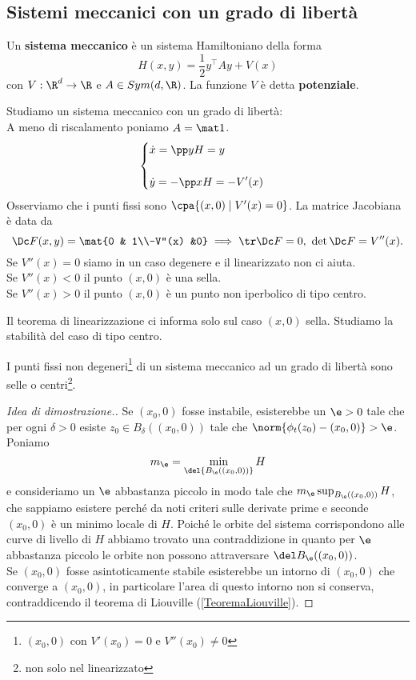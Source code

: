\subsection{Sistemi meccanici con un grado di libert\`a}
\begin{definition}
Un \textbf{sistema meccanico} \`e un sistema Hamiltoniano della forma
\[H(x,y)=\frac12y^\top A y+V(x)\]
con $V:\R^d\to\R$ e $A\in Sym(d,\R)$. La funzione $V$ \`e detta \textbf{potenziale}.
\end{definition}

\noindent Studiamo un sistema meccanico con un grado di libert\`a:\\
A meno di riscalamento poniamo $A=\mat1$.
\[\begin{cases}
\displaystyle\dot x=\pp yH=y\\\\
\displaystyle\dot y=-\pp xH=-V'(x)
\end{cases}\]
Osserviamo che i punti fissi sono $\cpa{(x,0)\mid V'(x)=0}$. La matrice Jacobiana \`e data da
\[\Dc F(x,y)=\mat{0 & 1\\-V''(x) &0}\implies \tr \Dc F=0,\ \det \Dc F=V''(x).\]
Se $V''(x)=0$ siamo in un caso degenere e il linearizzato non ci aiuta.\\
Se $V''(x)<0$ il punto $(x,0)$ \`e una sella.\\
Se $V''(x)>0$ il punto $(x,0)$ \`e un punto non iperbolico di tipo centro.
\vspace*{0.5cm}

\noindent Il teorema di linearizzazione ci informa solo sul caso $(x,0)$ sella. Studiamo la stabilit\`a del caso di tipo centro.



\begin{proposition}\label{CaratterizzazionePuntiFissiSistemaMeccanico1GradoLiberta}
I punti fissi non degeneri\footnote{$(x_0,0)$ con $V'(x_0)=0$ e $V''(x_0)\neq 0$} di un sistema meccanico ad un grado di libert\`a sono selle o centri\footnote{non solo nel linearizzato}.
\end{proposition}
\begin{proof}[Idea di dimostrazione.]
Se $(x_0,0)$ fosse instabile, esisterebbe un $\e>0$ tale che per ogni $\delta>0$ esiste $z_0\in B_\delta((x_0,0))$ tale che $\norm{\phi_t(z_0)-(x_0,0)}>\e$. Poniamo
\[m_\e=\min_{\del{B_\e((x_0,0))}} H\]
e consideriamo un $\e$ abbastanza piccolo in modo tale che $m_\e\sup_{B_\e((x_0,0))} H$, che sappiamo esistere perch\'e da noti criteri sulle derivate prime e seconde $(x_0,0)$ \`e un minimo locale di $H$.
Poich\'e le orbite del sistema corrispondono alle curve di livello di $H$ abbiamo trovato una contraddizione in quanto per $\e$ abbastanza piccolo le orbite non possono attraversare $\del B_\e((x_0,0))$.\\
Se $(x_0,0)$ fosse asintoticamente stabile esisterebbe un intorno di $(x_0,0)$ che converge a $(x_0,0)$, in particolare l'area di questo intorno non si conserva, contraddicendo il teorema di Liouville (\ref{TeoremaLiouville}).
\end{proof}
